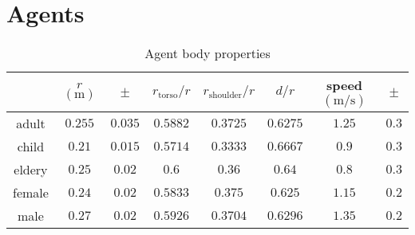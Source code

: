 \section{Agents}

\begin{table}[H]
\begin{tabular}{c|ccccccc}
& $ r $ $ (\mathrm{m}) $ & $ \pm $ & $ r_{\text{torso}} / r $ & $ r_{\text{shoulder}} / r $ & $ d / r $ & speed $ (\mathrm{m} / \mathrm{s}) $ & $ \pm $ \\
\hline\hline
adult & $ 0.255 $ & $ 0.035 $ & $ 0.5882 $ & $ 0.3725 $ & $ 0.6275 $ & $ 1.25 $ & $ 0.3 $ \\
child & $ 0.21 $ & $ 0.015 $ & $ 0.5714 $ & $ 0.3333 $ & $ 0.6667 $ & $ 0.9 $ & $ 0.3 $ \\
eldery & $ 0.25 $ & $ 0.02 $ & $ 0.6 $ & $ 0.36 $ & $ 0.64 $ & $ 0.8 $ & $ 0.3 $ \\
female & $ 0.24 $ & $ 0.02 $ & $ 0.5833 $ & $ 0.375 $ & $ 0.625 $ & $ 1.15 $ & $ 0.2 $ \\
male & $ 0.27 $ & $ 0.02 $ & $ 0.5926 $ & $ 0.3704 $ & $ 0.6296 $ & $ 1.35 $ & $ 0.2 $ \\
\end{tabular} 
\caption{Agent body properties}
\end{table} 